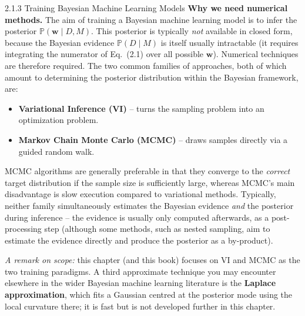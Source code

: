 \documentclass[aspectratio=169,10pt]{beamer}
\begin{document}
\begin{frame}[allowframebreaks]{2.1.3 Training Bayesian Machine Learning Models}
  \textbf{Why we need numerical methods.} The aim of training a Bayesian
  machine learning model is to infer the posterior
  $\mathbb{P}(\mathbf{w}\mid D,M)$. This posterior is typically \emph{not}
  available in closed form, because the Bayesian evidence
  $\mathbb{P}(D\mid M)$ is itself usually intractable (it requires
  integrating the numerator of Eq.~(2.1) over all possible $\mathbf{w}$).
  Numerical techniques are therefore required. The two common families of
  approaches, both of which amount to determining the posterior distribution
  within the Bayesian framework, are:
  \begin{itemize}
    \item \textbf{Variational Inference (VI)} -- turns the sampling problem
      into an optimization problem.
    \item \textbf{Markov Chain Monte Carlo (MCMC)} -- draws samples directly
      via a guided random walk.
  \end{itemize}
  MCMC algorithms are generally preferable in that they converge to the
  \emph{correct} target distribution if the sample size is sufficiently
  large, whereas MCMC's main disadvantage is slow execution compared to
  variational methods. Typically, neither family simultaneously estimates
  the Bayesian evidence \emph{and} the posterior during inference -- the
  evidence is usually only computed afterwards, as a post-processing step
  (although some methods, such as nested sampling, aim to estimate the
  evidence directly and produce the posterior as a by-product).

  \textit{A remark on scope:} this chapter (and this book) focuses on VI and
  MCMC as the two training paradigms. A third approximate technique you may
  encounter elsewhere in the wider Bayesian machine learning literature is
  the \textbf{Laplace approximation}, which fits a Gaussian centred at the
  posterior mode using the local curvature there; it is fast but is not
  developed further in this chapter.
\end{frame}
\end{document}
